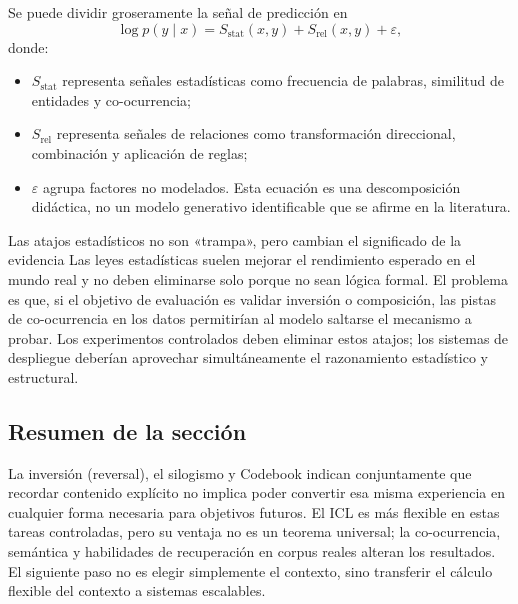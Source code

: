 
Se puede dividir groseramente la señal de predicción en
$$
\log p(y\mid x)=S_{\text{stat}}(x,y)+S_{\text{rel}}(x,y)+\varepsilon,
$$
donde:
\begin{itemize}
  \item $S_{\text{stat}}$ representa señales estadísticas como frecuencia de palabras, similitud de entidades y co-ocurrencia;
  \item $S_{\text{rel}}$ representa señales de relaciones como transformación direccional, combinación y aplicación de reglas;
  \item $\varepsilon$ agrupa factores no modelados. Esta ecuación es una descomposición didáctica, no un modelo generativo identificable que se afirme en la literatura.
\end{itemize}

\begin{warningbox}{Las atajos estadísticos no son «trampa», pero cambian el significado de la evidencia}
Las leyes estadísticas suelen mejorar el rendimiento esperado en el mundo real y no deben eliminarse solo porque no sean lógica formal. El problema es que, si el objetivo de evaluación es validar inversión o composición, las pistas de co-ocurrencia en los datos permitirían al modelo saltarse el mecanismo a probar. Los experimentos controlados deben eliminar estos atajos; los sistemas de despliegue deberían aprovechar simultáneamente el razonamiento estadístico y estructural.
\end{warningbox}



\subsection{Resumen de la sección}

La inversión (reversal), el silogismo y Codebook indican conjuntamente que recordar contenido explícito no implica poder convertir esa misma experiencia en cualquier forma necesaria para objetivos futuros. El ICL es más flexible en estas tareas controladas, pero su ventaja no es un teorema universal; la co-ocurrencia, semántica y habilidades de recuperación en corpus reales alteran los resultados. El siguiente paso no es elegir simplemente el contexto, sino transferir el cálculo flexible del contexto a sistemas escalables.


